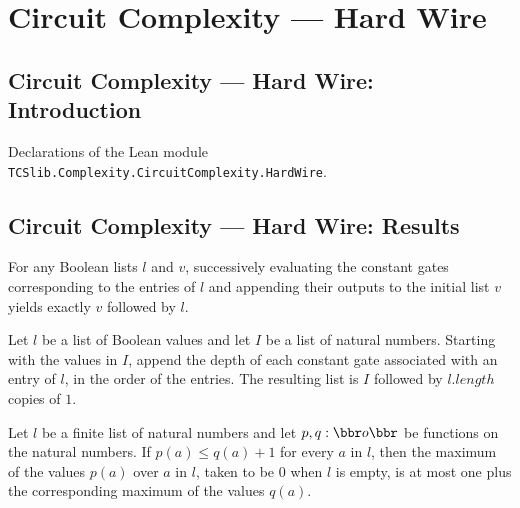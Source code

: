 \section{Circuit Complexity --- Hard Wire}
\subsection*{Circuit Complexity --- Hard Wire: Introduction}

Declarations of the Lean module \texttt{TCSlib.Complexity.CircuitComplexity.HardWire}.

\subsection*{Circuit Complexity --- Hard Wire: Results}

\begin{theorem}
\label{BoolCircuit.runWith_eval_constGates}
\leanok
{}
For any Boolean lists $l$ and $v$, successively evaluating the constant gates
corresponding to the entries of $l$ and appending their outputs to the initial list $v$
yields exactly $v$ followed by $l$.
\end{theorem}

\begin{theorem}
\label{BoolCircuit.runWith_depth_constGates}
\leanok
{}
Let $l$ be a list of Boolean values and let $I$ be a list of natural numbers. Starting
with the values in $I$, append the depth of each constant gate associated with an entry
of $l$, in the order of the entries. The resulting list is $I$ followed by $l.length$
copies of $1$.
\end{theorem}

\begin{theorem}
\label{BoolCircuit.foldr_max_le_succ}
\leanok
{}
Let $l$ be a finite list of natural numbers and let $p,q:\bbr	o\bbr$ be functions on the
natural numbers. If $p(a)\le q(a)+1$ for every $a$ in $l$, then the maximum of the
values $p(a)$ over $a$ in $l$, taken to be $0$ when $l$ is empty, is at most one plus
the corresponding maximum of the values $q(a)$.
\end{theorem}

